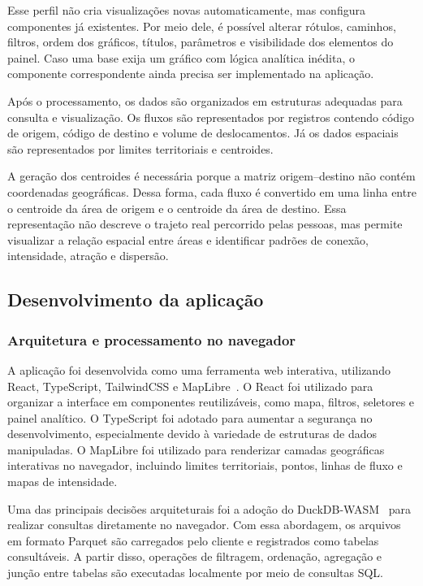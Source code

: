 \documentclass[12pt]{article}
\begin{document}
Esse perfil não cria visualizações novas automaticamente, mas configura componentes já existentes. Por meio dele, é possível alterar rótulos, caminhos, filtros, ordem dos gráficos, títulos, parâmetros e visibilidade dos elementos do painel. Caso uma base exija um gráfico com lógica analítica inédita, o componente correspondente ainda precisa ser implementado na aplicação.

Após o processamento, os dados são organizados em estruturas adequadas para consulta e visualização. Os fluxos são representados por registros contendo código de origem, código de destino e volume de deslocamentos. Já os dados espaciais são representados por limites territoriais e centroides.

A geração dos centroides é necessária porque a matriz origem--destino não contém coordenadas geográficas. Dessa forma, cada fluxo é convertido em uma linha entre o centroide da área de origem e o centroide da área de destino. Essa representação não descreve o trajeto real percorrido pelas pessoas, mas permite visualizar a relação espacial entre áreas e identificar padrões de conexão, intensidade, atração e dispersão.

\subsection{Desenvolvimento da aplicação}

\subsubsection*{Arquitetura e processamento no navegador}

A aplicação foi desenvolvida como uma ferramenta web interativa, utilizando React, TypeScript, TailwindCSS e MapLibre~\cite{reactDocs,typescriptDocs,tailwindDocs,maplibreDocs}. O React foi utilizado para organizar a interface em componentes reutilizáveis, como mapa, filtros, seletores e painel analítico. O TypeScript foi adotado para aumentar a segurança no desenvolvimento, especialmente devido à variedade de estruturas de dados manipuladas. O MapLibre foi utilizado para renderizar camadas geográficas interativas no navegador, incluindo limites territoriais, pontos, linhas de fluxo e mapas de intensidade.

Uma das principais decisões arquiteturais foi a adoção do DuckDB-WASM~\cite{duckdbWasmDocs} para realizar consultas diretamente no navegador. Com essa abordagem, os arquivos em formato Parquet são carregados pelo cliente e registrados como tabelas consultáveis. A partir disso, operações de filtragem, ordenação, agregação e junção entre tabelas são executadas localmente por meio de consultas SQL.
\end{document}
